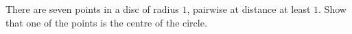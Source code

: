 There are seven points in a disc of radius $1$, pairwise at distance at least $1$. Show that one of the points is the centre of the circle.
